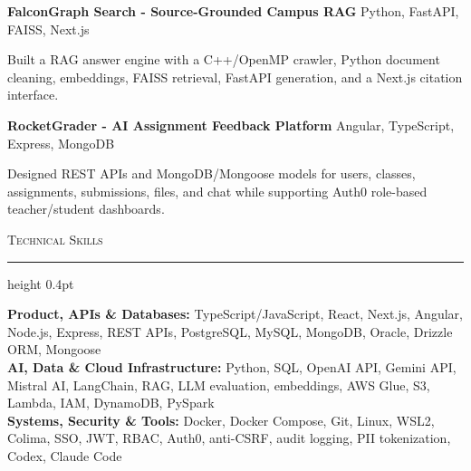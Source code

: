 \documentclass[letterpaper,11pt]{article}
\newcommand{\resumesection}[1]{%
  \par\vspace{2pt}%
  {\large\scshape #1}\par\vspace{2pt}%
  \hrule height 0.4pt\vspace{2pt}%
}
\newcommand{\projectHeading}[2]{
  \textbf{#1} \hfill #2
}
\begin{document}
\projectHeading{FalconGraph Search - Source-Grounded Campus RAG}{Python, FastAPI, FAISS, Next.js}
\begin{tightitemize}
  \item Built a RAG answer engine with a C++/OpenMP crawler, Python document cleaning, embeddings, FAISS retrieval, FastAPI generation, and a Next.js citation interface.
\end{tightitemize}

\projectHeading{RocketGrader - AI Assignment Feedback Platform}{Angular, TypeScript, Express, MongoDB}
\begin{tightitemize}
  \item Designed REST APIs and MongoDB/Mongoose models for users, classes, assignments, submissions, files, and chat while supporting Auth0 role-based teacher/student dashboards.
\end{tightitemize}

\resumesection{Technical Skills}
\textbf{Product, APIs \& Databases:} TypeScript/JavaScript, React, Next.js, Angular, Node.js, Express, REST APIs, PostgreSQL, MySQL, MongoDB, Oracle, Drizzle ORM, Mongoose\\
\textbf{AI, Data \& Cloud Infrastructure:} Python, SQL, OpenAI API, Gemini API, Mistral AI, LangChain, RAG, LLM evaluation, embeddings, AWS Glue, S3, Lambda, IAM, DynamoDB, PySpark\\
\textbf{Systems, Security \& Tools:} Docker, Docker Compose, Git, Linux, WSL2, Colima, SSO, JWT, RBAC, Auth0, anti-CSRF, audit logging, PII tokenization, Codex, Claude Code
\end{document}
